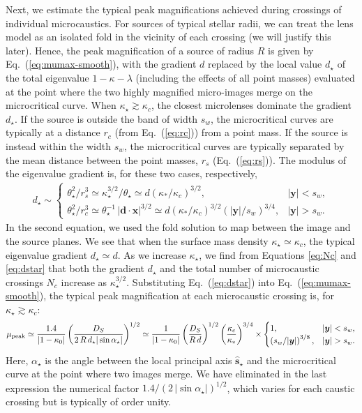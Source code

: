 \documentclass{aastex6}
\newcommand{\bt}[1]{\mathbf #1}
\newcommand{\refeq}[1]{Eq.~(\ref{eq:#1})}
\def\bfx{\boldsymbol{x}}
\def\bfy{\boldsymbol{y}}
\def\bfd{\boldsymbol{d}}
\newcommand{\ba}{\begin{eqnarray}}
\newcommand{\ea}{\end{eqnarray}}
\begin{document}
Next, we estimate the typical peak magnifications achieved during crossings of individual microcaustics. For sources of typical stellar radii, we can treat the lens model as an isolated fold in the vicinity of each crossing (we will justify this later). Hence, the peak magnification of a source of radius $R$ is given by \refeq{mumax-smooth}, with the gradient $d$ replaced by the local value $d_\star$ of the total eigenvalue $1-\kappa-\lambda$ (including the effects of all point masses) evaluated at the point where the two highly magnified micro-images merge on the microcritical curve. When $\kappa_\star \gtrsim \kappa_c$, the closest microlenses dominate the gradient $d_\star$. If the source is outside the band of width $s_w$, the microcritical curves are typically at a distance $r_c$ (from \refeq{rc}) from a point mass. If the source is instead within the width $s_w$, the microcritical curves are typically separated by the mean distance between the point masses, $r_s$ (\refeq{rs}). The modulus of the eigenvalue gradient is, for these two cases, respectively,
\ba
  d_\star 
  \sim \begin{cases}
  \theta_\star^2/r^3_s \simeq \kappa^{3/2}_\star/\theta_\star \simeq d \left( \kappa_*/\kappa_c \right)^{3/2}, 
  & \vert \bfy \vert < s_w, \\  
  \theta_\star^2/r^3_c \simeq \theta_\star^{-1}\, | \bfd \cdot \bfx |^{3/2}
 \simeq d \left( \kappa_*/\kappa_c \right)^{3/2}
 \left( | \bfy |/s_w \right)^{3/4}, & | \bfy | > s_w.
  \end{cases}
\label{eq:dstar}
\ea
In the second equation, we used the fold solution to map between the image and the source planes. We see that when the surface mass density $\kappa_\star \simeq \kappa_c$, the typical eigenvalue gradient $d_\star \simeq d$. As we increase $\kappa_\star$, we find from Equations \eqref{eq:Nc} and \eqref{eq:dstar} that both the gradient $d_\star$ and the total number of microcaustic crossings $N_c$ increase as $\kappa_\star^{3/2}$. Substituting \refeq{dstar} into \refeq{mumax-smooth}, the typical peak magnification at each microcaustic crossing is, for $\kappa_\star \gtrsim \kappa_c$:
\ba
\label{eq:microlen_mumax}
\mu_{\rm peak} \simeq \frac{1.4}{|1-\kappa_0|}
 \left( \frac{D_S}{2\,R\,d_\star | \sin \alpha_\star |} \right)^{1/2}
 \simeq \frac{1}{|1-\kappa_0|} \left( \frac{D_S}{R\,d} \right)^{1/2}
 \left( \frac{\kappa_c}{\kappa_*} \right)^{3/4} \times 
 \begin{cases}
   1, & \vert \bfy \vert < s_w, \\
   \left( s_w/ |\bfy |  \right)^{3/8}, & | \bfy | > s_w.
 \end{cases}
\ea
Here, $\alpha_\star$ is the angle between the local principal axis $\hat{\bt s}_\star$ and the microcritical curve at the point where two images merge. We have eliminated in the last expression the numerical factor $1.4/(2\, | \sin\alpha_\star | )^{1/2}$, which varies for each caustic crossing but is typically of order unity. 
\end{document}
